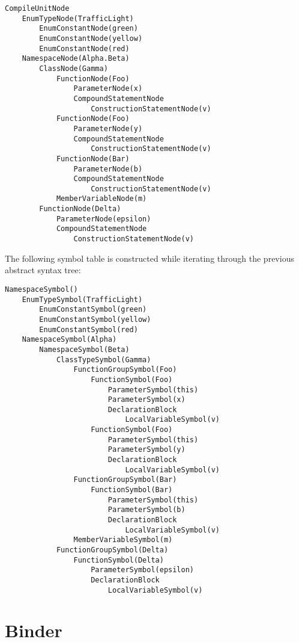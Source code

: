 \documentclass[a4paper,oneside,11pt]{book}
\theoremstyle{definition}
\begin{document}
\begin{verbatim}
CompileUnitNode
    EnumTypeNode(TrafficLight)
        EnumConstantNode(green)
        EnumConstantNode(yellow)
        EnumConstantNode(red)
    NamespaceNode(Alpha.Beta)
        ClassNode(Gamma)
            FunctionNode(Foo)
                ParameterNode(x)
                CompoundStatementNode
                    ConstructionStatementNode(v)
            FunctionNode(Foo)
                ParameterNode(y)
                CompoundStatementNode
                    ConstructionStatementNode(v)
            FunctionNode(Bar)
                ParameterNode(b)
                CompoundStatementNode
                    ConstructionStatementNode(v)
            MemberVariableNode(m)
        FunctionNode(Delta)
            ParameterNode(epsilon)
            CompoundStatementNode
                ConstructionStatementNode(v)
\end{verbatim}

\clearpage
The following symbol table is constructed while iterating through the previous abstract syntax tree:

\begin{verbatim}
NamespaceSymbol()
    EnumTypeSymbol(TrafficLight)
        EnumConstantSymbol(green)
        EnumConstantSymbol(yellow)
        EnumConstantSymbol(red)
    NamespaceSymbol(Alpha)
        NamespaceSymbol(Beta)
            ClassTypeSymbol(Gamma)
                FunctionGroupSymbol(Foo)
                    FunctionSymbol(Foo)
                        ParameterSymbol(this)
                        ParameterSymbol(x)
                        DeclarationBlock
                            LocalVariableSymbol(v)
                    FunctionSymbol(Foo)
                        ParameterSymbol(this)
                        ParameterSymbol(y)
                        DeclarationBlock
                            LocalVariableSymbol(v)
                FunctionGroupSymbol(Bar)
                    FunctionSymbol(Bar)
                        ParameterSymbol(this)
                        ParameterSymbol(b)
                        DeclarationBlock
                            LocalVariableSymbol(v)
                MemberVariableSymbol(m)
            FunctionGroupSymbol(Delta)
                FunctionSymbol(Delta)
                    ParameterSymbol(epsilon)
                    DeclarationBlock
                        LocalVariableSymbol(v)
\end{verbatim}

\chapter{Binder}
\end{document}
